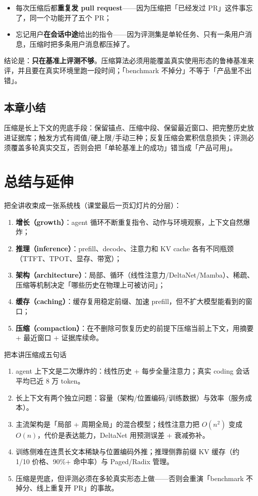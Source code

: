 \documentclass[a4paper]{article}
\begin{document}
\begin{itemize}
\item 每次压缩后都\textbf{重复发 pull request}——因为压缩把「已经发过 PR」这件事忘了，同一个功能开了五个 PR；
\item 忘记用户\textbf{在会话中途}给出的指令——因为评测集是单轮任务、只有一条用户消息，压缩时把多条用户消息都压掉了。
\end{itemize}

结论是：\textbf{只在基准上评测不够}。压缩算法必须用能覆盖真实使用形态的鲁棒基准来评，并且要在真实环境里跑一段时间；「benchmark 不掉分」不等于「产品里不出错」。

\subsection{本章小结}
压缩是长上下文的兜底手段：保留锚点、压缩中段、保留最近窗口、把完整历史放进证据库；触发方式有阈值/硬上限/手动三种；反复压缩会累积信息损失；评测必须覆盖多轮真实交互，否则会把「单轮基准上的成功」错当成「产品可用」。

\section{总结与延伸}

把全讲收束成一张系统栈（课堂最后一页幻灯片的分层）：

\begin{enumerate}
\item \textbf{增长（growth）}：agent 循环不断重复指令、动作与环境观察，上下文自然爆炸；
\item \textbf{推理（inference）}：prefill、decode、注意力和 KV cache 各有不同瓶颈（TTFT、TPOT、显存、带宽）；
\item \textbf{架构（architecture）}：局部、循环（线性注意力/DeltaNet/Mamba）、稀疏、压缩等机制决定「哪些历史在物理上可被访问」；
\item \textbf{缓存（caching）}：缓存复用稳定前缀、加速 prefill，但不扩大模型能看到的窗口；
\item \textbf{压缩（compaction）}：在不删除可恢复历史的前提下压缩当前上下文，用摘要 + 最近窗口 + 证据库续命。
\end{enumerate}

\begin{importantbox}{把本讲压缩成五句话}
\begin{enumerate}
\item agent 上下文是二次爆炸的：线性历史 + 每步全量注意力；真实 coding 会话平均已近 8 万 token。
\item 长上下文有两个独立问题：容量（架构/位置编码/训练数据）与效率（服务成本）。
\item 主流架构是「局部 + 周期全局」的混合模型；线性注意力把 $O(n^2)$ 变成 $O(n)$，代价是表达能力，DeltaNet 用预测误差 + 衰减弥补。
\item 训练侧难在连贯长文本稀缺与位置编码外推；推理侧靠前缀 KV 缓存（约 1/10 价格、90\%+ 命中率）与 Paged/Radix 管理。
\item 压缩是兜底，但评测必须在多轮真实形态上做——否则会重演「benchmark 不掉分、线上重复开 PR」的事故。
\end{enumerate}
\end{importantbox}
\end{document}
